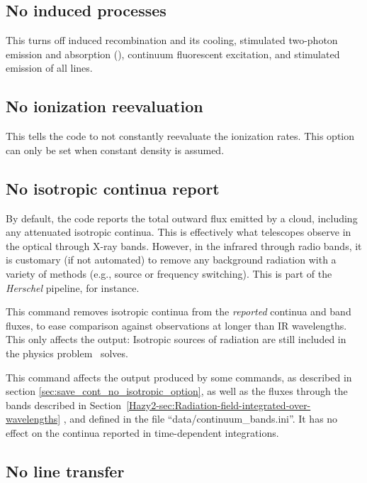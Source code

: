 \subsection{No induced processes}

This turns off induced recombination and its cooling, stimulated
two-photon emission and absorption (\citealp{Bottorff2006}), continuum
fluorescent excitation, and stimulated emission of all lines.

\subsection{No ionization reevaluation}

This tells the code to not constantly reevaluate the ionization rates.
This option can only be set when constant density is assumed.

\subsection{No isotropic continua report}
\label{sec:no_isotropic_continua}

By default, the code reports the total outward flux emitted
by a cloud, including any attenuated isotropic continua.
This is effectively what telescopes observe in the optical
through X-ray bands.
However, in the infrared through radio bands, it is customary
(if not automated) to remove any background radiation with a
variety of methods (e.g., source or frequency switching).
This is part of the {\em Herschel} pipeline, for instance.

\par
This command removes isotropic continua from the {\it reported}
continua and band fluxes, to ease comparison against observations
at longer than IR wavelengths.
This only affects the output:
Isotropic sources of radiation are still included in the physics
problem \Cloudy\ solves.

\par
This command affects the output produced by some  commands,
as described in section \ref{sec:save_cont_no_isotropic_option},
as well as the fluxes through the bands described in
Section~\ref{Hazy2-sec:Radiation-field-integrated-over-wavelengths}
,
and defined in the file ``data/continuum\_bands.ini''.
It has no effect on the continua reported in time-dependent
integrations.

\subsection{No line transfer}

